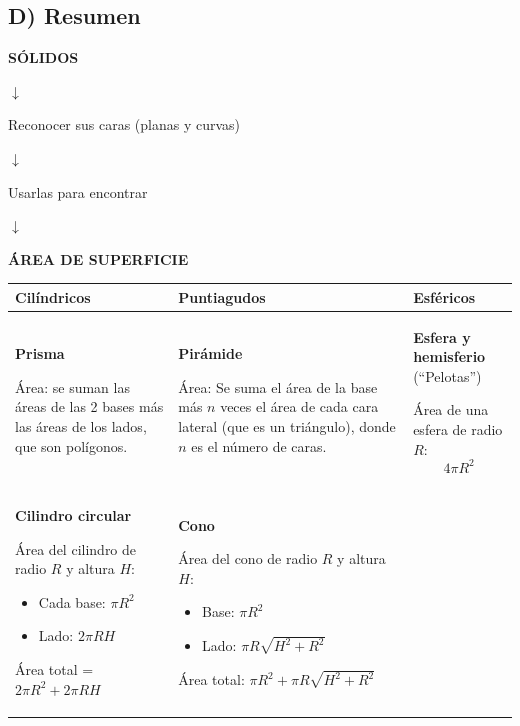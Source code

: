 \documentclass[12pt,a4paper]{article}
\begin{document}
\vspace{4mm}


\subsection*{D) Resumen}

\begin{center}
\textbf{SÓLIDOS}

$\downarrow$

Reconocer sus caras (planas y curvas)

$\downarrow$

Usarlas para encontrar

$\downarrow$

\textbf{ÁREA DE SUPERFICIE}
\end{center}

\begin{tcolorbox}[colback=fondoazul, colframe=azuloscuro, title=\textbf{ÁREAS DE SUPERFICIE}, breakable]
\begin{center}
\begin{tabular}{|
		>{\centering\arraybackslash}m{3.5cm}|
		>{\centering\arraybackslash}m{3.5cm}|
		>{\centering\arraybackslash}m{3.5cm}|}
\hline
\textbf{Cilíndricos} & \textbf{Puntiagudos} & \textbf{Esféricos} \\
\hline
\textbf{Prisma}

Área: se suman las áreas de las 2 bases más las áreas de los lados, que son polígonos. &
\textbf{Pirámide}

Área: Se suma el área de la base más $n$ veces el área de cada cara lateral (que es un triángulo), donde $n$ es el número de caras. &
\textbf{Esfera y hemisferio} (``Pelotas'')

Área de una esfera de radio $R$:
$$4\pi R^2$$ \\
\hline
\textbf{Cilindro circular}

Área del cilindro de radio $R$ y altura $H$:
\begin{itemize}[nosep]
    \item Cada base: $\pi R^2$
    \item Lado: $2\pi RH$
\end{itemize}

Área total = $2\pi R^2 + 2\pi RH$ &
\textbf{Cono}

Área del cono de radio $R$ y altura $H$:
\begin{itemize}[nosep]
    \item Base: $\pi R^2$
    \item Lado: $\pi R\sqrt{H^2 + R^2}$
\end{itemize}

Área total: $\pi R^2 + \pi R\sqrt{H^2 + R^2}$ & \\
\hline
\end{tabular}
\end{center}
\end{tcolorbox}
\end{document}
